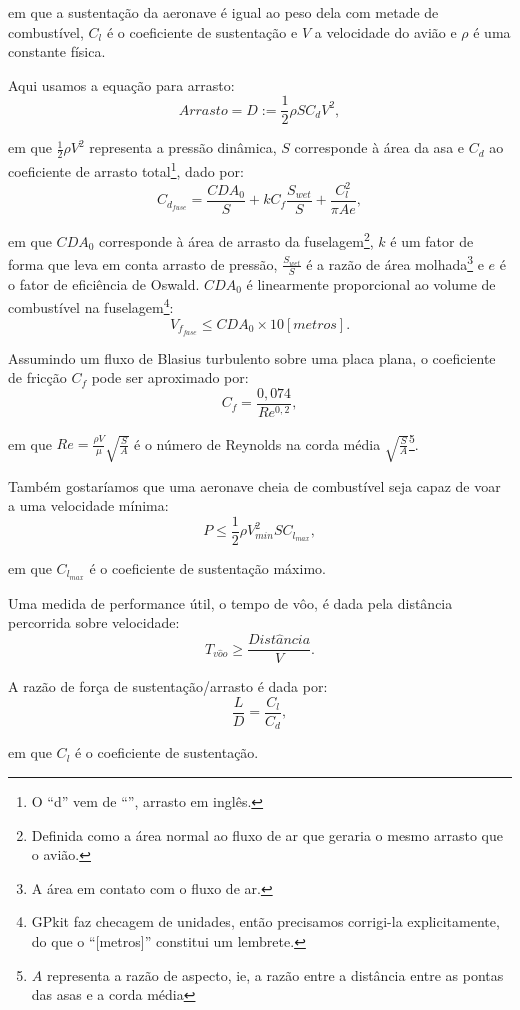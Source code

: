\noindent em que a sustentação da aeronave é igual ao peso dela com
metade de combustível, $C_l$ é o coeficiente de sustentação e $V$ a
velocidade do avião e $\rho$ é uma constante física.

Aqui usamos a equação para arrasto:
\[
  Arrasto = D := \frac{1}{2} \rho S C_d V^2,
\]

\noindent em que $\frac{1}{2}\rho V^2$ representa a pressão dinâmica,
$S$ corresponde à área da asa e $C_d$ ao coeficiente de arrasto
total\footnote{O ``d'' vem de ``'', arrasto em inglês.},
dado por:
\[
  C_{d_{fuse}} = \frac{CDA_0}{S} + kC_f \frac{S_{wet}}{S} +
  \frac{C_{l}^2}{\pi A e},
\]

\noindent em que $CDA_0$ corresponde à área de arrasto da
fuselagem\footnote{Definida como a área normal ao fluxo de ar que
  geraria o mesmo arrasto que o avião.}, $k$ é um fator de forma que
leva em conta arrasto de pressão, $\frac{S_{wet}}{S}$ é a razão de
área molhada\footnote{A área em contato com o fluxo de ar.} e $e$ é o
fator de eficiência de Oswald. $CDA_0$ é linearmente proporcional ao
volume de combustível na fuselagem\footnote{GPkit faz checagem de
  unidades, então precisamos corrigi-la explicitamente, do que o
  ``[metros]'' constitui um lembrete.}:
\[
  V_{f_{fase}} \leq CDA_0 \times 10 [metros].
\]




Assumindo um fluxo de Blasius turbulento sobre uma placa plana, o
coeficiente de fricção $C_f$ pode ser aproximado por:
\[
  C_f = \frac{0,074}{Re^{0,2}},
\]

\noindent em que $Re = \frac{\rho V}{\mu}\sqrt{\frac{S}{A}}$ é o
número de Reynolds na corda média $\sqrt{\frac{S}{A}}$\footnote{$A$
  representa a razão de aspecto, ie, a razão entre a distância entre
  as pontas das asas e a corda média}.

Também gostaríamos que uma aeronave cheia de combustível seja capaz de
voar a uma velocidade mínima:
\[
  P \leq \frac{1}{2}\rho V_{min}^{2} S C_{l_{max}},
\]

\noindent em que $C_{l_{max}}$ é o coeficiente de sustentação máximo.

Uma medida de performance útil, o tempo de vôo, é dada pela distância
percorrida sobre velocidade:
\[
  T_{v\hat{o}o} \geq \frac{Dist\hat{a}ncia}{V}.
\]

A razão de força de sustentação/arrasto é dada por:
\[
  \frac{L}{D} = \frac{C_l}{C_d},
\]

\noindent em que $C_l$ é o coeficiente de sustentação.

